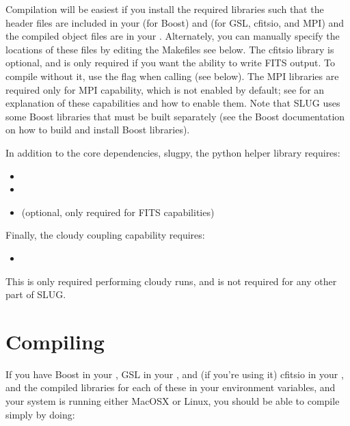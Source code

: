 \documentclass[letterpaper,10pt,english]{sphinxmanual}
\begin{document}
Compilation will be easiest if you install the required libraries such that the header files are included in your  (for Boost) and  (for GSL, cfitsio, and MPI) and the compiled object files are in your . Alternately, you can manually specify the locations of these files by editing the Makefiles \textendash{} see below. The cfitsio library is optional, and is only required if you want the ability to write FITS output. To compile without it, use the flag  when calling  (see below). The MPI libraries are required only for MPI capability, which is not enabled by default; see {\hyperref[\detokenize{library:ssec-mpi-support}]{}} for an explanation of these capabilities and how to enable them. Note that SLUG uses some Boost libraries that must be built separately (see the Boost documentation on how to build and install Boost libraries).

In addition to the core dependencies, slugpy, the python helper library requires:
\begin{itemize}
\item {} 

\item {} 

\item {} 
 (optional, only required for FITS capabilities)

\end{itemize}

Finally, the cloudy coupling capability requires:
\begin{itemize}
\item {} 

\end{itemize}

This is only required performing cloudy runs, and is not required for any other part of SLUG.


\section{Compiling}
\label{\detokenize{compiling:ssec-compiling}}\label{\detokenize{compiling:compiling}}
If you have Boost in your , GSL in your , and (if you’re using it) cfitsio in your , and the compiled libraries for each of these in your  environment variables, and your system is running either MacOSX or Linux, you should be able to compile simply by doing:
\end{document}
